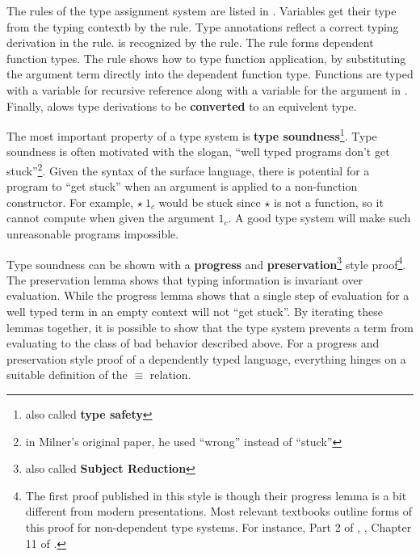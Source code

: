 The rules of the type assignment system are listed in .
Variables get their type from the typing contextb by the  rule.
Type annotations reflect a correct typing derivation in the  rule.
\Tit{} is recognized by the  rule.
The  rule forms dependent function types.
The  rule shows how to type function application, by substituting the argument term directly into the dependent function type.
Functions are typed with a variable for recursive reference along with a variable for the argument in .
Finally,  alows type derivations to be \textbf{converted} to an equivelent type.

The most important property of a type system is \textbf{type soundness}\footnote{also called \textbf{type safety}}.
Type soundness is often motivated with the slogan, ``well typed programs don't get stuck''\cite{MILNER1978348}\footnote{in Milner's original paper, he used ``wrong'' instead of ``stuck''}.
Given the syntax of the surface language, there is potential for a program to ``get stuck'' when an argument is applied to a non-function constructor.
For example, $\star\ 1_{c}$ would be stuck since $\star$ is not a function, so it cannot compute when given the argument $1_{c}$.
A good type system will make such unreasonable programs impossible.

Type soundness can be shown with a \textbf{progress} and \textbf{preservation}\footnote{also called \textbf{Subject Reduction}} style proof\footnote{
  The first proof published in this style is \cite{WRIGHT199438} though their progress lemma is a bit different from modern presentations.
  Most relevant textbooks outline forms of this proof for non-dependent type systems.
  For instance, Part 2 of \cite{pierce2002types}, \cite{KOKKE2020102440}, Chapter 11 of \cite{chlipala2017formal}.
  }.
The preservation lemma shows that typing information is invariant over evaluation.
While the progress lemma shows that a single step of evaluation for a well typed term in an empty context will not ``get stuck''.
By iterating these lemmas together, it is possible to show that the type system prevents a term from evaluating to the class of bad behavior described above.
For a progress and preservation style proof of a dependently typed language, everything hinges on a suitable definition of the $\equiv$ relation.

